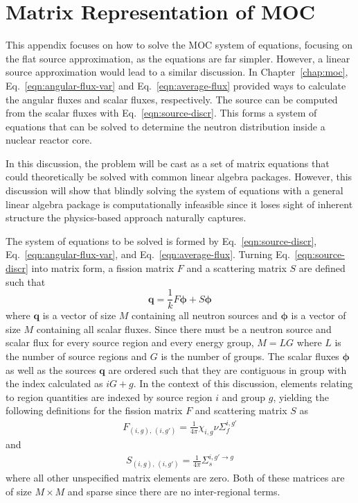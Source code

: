 \chapter{Matrix Representation of MOC}
\label{app:matrix-moc}

This appendix focuses on how to solve the \ac{MOC} system of equations, focusing on the flat source approximation, as the equations are far simpler. However, a linear source approximation would lead to a similar discussion. In Chapter~\ref{chap:moc}, Eq.~\ref{eqn:angular-flux-var} and Eq.~\ref{eqn:average-flux} provided ways to calculate the angular fluxes and scalar fluxes, respectively. The source can be computed from the scalar fluxes with Eq.~\ref{eqn:source-discr}. This forms a system of equations that can be solved to determine the neutron distribution inside a nuclear reactor core. 

In this discussion, the problem will be cast as a set of matrix equations that could theoretically be solved with common linear algebra packages. However, this discussion will show that blindly solving the system of equations with a general linear algebra package is computationally infeasible since it loses sight of inherent structure the physics-based approach naturally captures.

The system of equations to be solved is formed by Eq.~\ref{eqn:source-discr}, Eq.~\ref{eqn:angular-flux-var}, and Eq.~\ref{eqn:average-flux}. Turning Eq.~\ref{eqn:source-discr} into matrix form, a fission matrix $F$ and a scattering matrix $S$ are defined such that
\begin{equation}
\mathbf{q} = \frac{1}{k} F \boldsymbol{\phi} + S \boldsymbol{\phi}
\label{eqn:matrix-source-calc}
\end{equation}
where $\mathbf{q}$ is a vector of size $M$ containing all neutron sources and $\boldsymbol{\phi}$ is a vector of size $M$ containing all scalar fluxes. Since there must be a neutron source and scalar flux for every source region and every energy group, $M = L G$ where $L$ is the number of source regions and $G$ is the number of groups. The scalar fluxes $\boldsymbol{\phi}$ as well as the sources $\mathbf{q}$ are ordered such that they are contiguous in group with the index calculated as $i G + g$. In the context of this discussion, elements relating to region quantities are indexed by source region $i$ and group $g$, yielding the following definitions for the fission matrix $F$ and scattering matrix $S$ as
\begin{eqnarray}
F_{\left(i, g\right), \, \left(i, g'\right)} = \frac{1}{4\pi} \chi_{i,g} \nu \Sigma_f^{i,g'}
\label{eqn:fission-matrix}
\end{eqnarray}
and
\begin{eqnarray}
S_{\left(i, g\right), \, \left(i, g'\right)} = \frac{1}{4\pi} \Sigma_s^{i,g' \rightarrow g}
\label{eqn:scattering-matrix}
\end{eqnarray}
where all other unspecified matrix elements are zero. Both of these matrices are of size $M \times M$ and sparse since there are no inter-regional terms.

